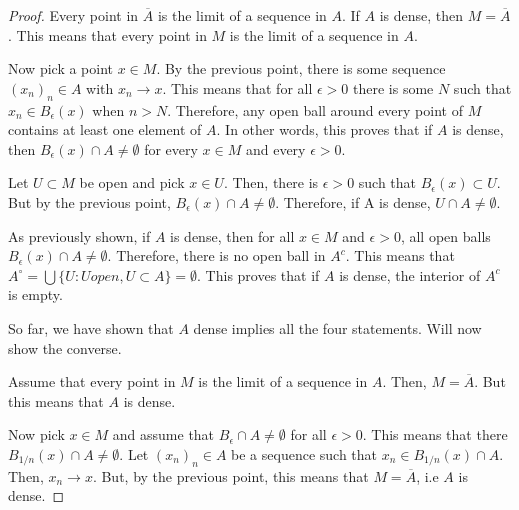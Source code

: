 \begin{proof}
Every point in $\overline{A}$ is the limit of a sequence in $A$. If $A$ is dense, then $M = \overline{A}$. This means that every point in $M$ is the limit of a sequence in $A$.


\vspace{1em}

Now pick a point $x \in M$. By the previous point, there is some sequence $(x_n)_n \in A$ with $x_n \rightarrow x$. This means that for all $\epsilon > 0$ there is some $N$ such that $x_n \in B_\epsilon(x)$ when $n>N$. Therefore, any open ball around every point of $M$ contains at least one element of $A$. In other words, this proves that if $A$ is dense, then $B_\epsilon(x) \cap A \neq \emptyset$ for every $x \in M$ and every $\epsilon > 0$.

\vspace{1em}
Let $U \subset M$ be open and pick $x \in U$. Then, there is $\epsilon > 0$ such that $B_\epsilon(x) \subset U$.  But by the previous point, $B_\epsilon(x)  \cap A \neq \emptyset$.   Therefore, if A is dense, $U \cap A \neq \emptyset$.


\vspace{1em}

As previously shown, if $A$ is dense, then for all $x \in M$ and $\epsilon > 0$, all open balls $B_\epsilon(x) \cap A \neq \emptyset$. Therefore, there is no open ball in $A^c$. This means that $A^\circ = \bigcup\{U: U open,  U \subset A\} = \emptyset$. This proves that if $A$ is dense, the interior of $A^c$ is empty.

\vspace{2em}

So far, we have shown that $A$ dense implies all the four statements. Will now show the converse.

\vspace{1em}

Assume that every point in $M$ is the limit of a sequence in $A$. Then, $M = \overline{A}$. But this means that $A$ is dense.

\vspace{1em}

Now pick $x \in M$ and assume that $B_\epsilon \cap A \neq \emptyset$ for all $\epsilon >0$. This means that there $B_{1/n}(x) \cap A \neq \emptyset$. Let $(x_n)_n \in A$ be a sequence such that $x_n \in B_{1/n}(x) \cap A$. Then, $x_n \rightarrow x$. But, by the previous point, this means that $M = \overline{A}$, i.e $A$ is dense.


\end{proof}

